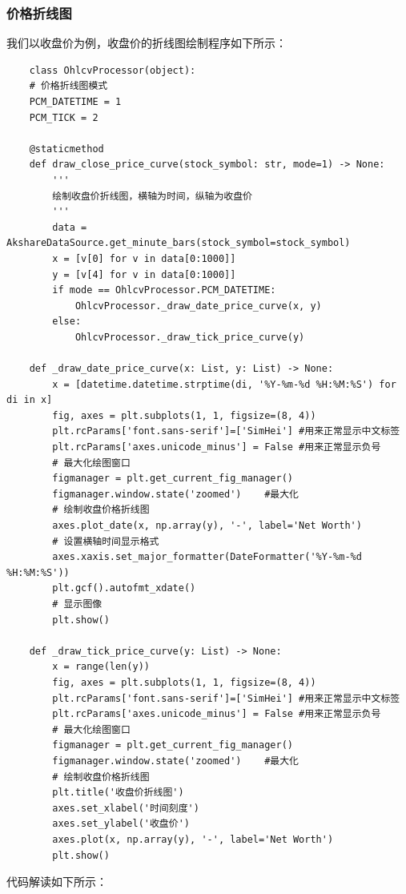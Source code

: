 \subsubsection{价格折线图}
我们以收盘价为例，收盘价的折线图绘制程序如下所示：
\begin{lstlisting}
    class OhlcvProcessor(object):
    # 价格折线图模式
    PCM_DATETIME = 1
    PCM_TICK = 2

    @staticmethod
    def draw_close_price_curve(stock_symbol: str, mode=1) -> None:
        '''
        绘制收盘价折线图，横轴为时间，纵轴为收盘价
        '''
        data = AkshareDataSource.get_minute_bars(stock_symbol=stock_symbol)
        x = [v[0] for v in data[0:1000]]
        y = [v[4] for v in data[0:1000]]
        if mode == OhlcvProcessor.PCM_DATETIME:
            OhlcvProcessor._draw_date_price_curve(x, y)
        else:
            OhlcvProcessor._draw_tick_price_curve(y)

    def _draw_date_price_curve(x: List, y: List) -> None:
        x = [datetime.datetime.strptime(di, '%Y-%m-%d %H:%M:%S') for di in x]
        fig, axes = plt.subplots(1, 1, figsize=(8, 4))
        plt.rcParams['font.sans-serif']=['SimHei'] #用来正常显示中文标签
        plt.rcParams['axes.unicode_minus'] = False #用来正常显示负号
        # 最大化绘图窗口
        figmanager = plt.get_current_fig_manager()
        figmanager.window.state('zoomed')    #最大化
        # 绘制收盘价格折线图
        axes.plot_date(x, np.array(y), '-', label='Net Worth')
        # 设置横轴时间显示格式
        axes.xaxis.set_major_formatter(DateFormatter('%Y-%m-%d %H:%M:%S'))
        plt.gcf().autofmt_xdate()
        # 显示图像
        plt.show()
    
    def _draw_tick_price_curve(y: List) -> None:
        x = range(len(y))
        fig, axes = plt.subplots(1, 1, figsize=(8, 4))
        plt.rcParams['font.sans-serif']=['SimHei'] #用来正常显示中文标签
        plt.rcParams['axes.unicode_minus'] = False #用来正常显示负号
        # 最大化绘图窗口
        figmanager = plt.get_current_fig_manager()
        figmanager.window.state('zoomed')    #最大化
        # 绘制收盘价格折线图
        plt.title('收盘价折线图')
        axes.set_xlabel('时间刻度')
        axes.set_ylabel('收盘价')
        axes.plot(x, np.array(y), '-', label='Net Worth')
        plt.show()
\end{lstlisting}
代码解读如下所示：
